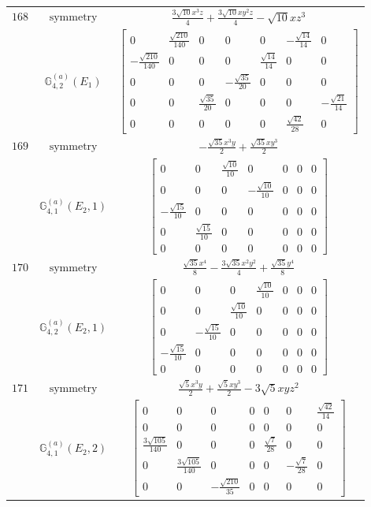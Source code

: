 \documentclass[fleqn,8pt,landscape]{jsarticle}
\begin{document}
\begin{longtable}{ccc}
$ 168 $ & $ \text{symmetry} $ & $ \frac{3 \sqrt{10} x^{3} z}{4} + \frac{3 \sqrt{10} x y^{2} z}{4} - \sqrt{10} x z^{3} $ \\
$  $ & $ \mathbb{G}_{4,2}^{(a)}(E_{1}) $ & $ \begin{bmatrix} 0 & \frac{\sqrt{210}}{140} & 0 & 0 & 0 & - \frac{\sqrt{14}}{14} & 0 \\ - \frac{\sqrt{210}}{140} & 0 & 0 & 0 & \frac{\sqrt{14}}{14} & 0 & 0 \\ 0 & 0 & 0 & - \frac{\sqrt{35}}{20} & 0 & 0 & 0 \\ 0 & 0 & \frac{\sqrt{35}}{20} & 0 & 0 & 0 & - \frac{\sqrt{21}}{14} \\ 0 & 0 & 0 & 0 & 0 & \frac{\sqrt{42}}{28} & 0 \end{bmatrix} $ \\ \hline
$ 169 $ & $ \text{symmetry} $ & $ - \frac{\sqrt{35} x^{3} y}{2} + \frac{\sqrt{35} x y^{3}}{2} $ \\
$  $ & $ \mathbb{G}_{4,1}^{(a)}(E_{2},1) $ & $ \begin{bmatrix} 0 & 0 & \frac{\sqrt{10}}{10} & 0 & 0 & 0 & 0 \\ 0 & 0 & 0 & - \frac{\sqrt{10}}{10} & 0 & 0 & 0 \\ - \frac{\sqrt{15}}{10} & 0 & 0 & 0 & 0 & 0 & 0 \\ 0 & \frac{\sqrt{15}}{10} & 0 & 0 & 0 & 0 & 0 \\ 0 & 0 & 0 & 0 & 0 & 0 & 0 \end{bmatrix} $ \\ \hline
$ 170 $ & $ \text{symmetry} $ & $ \frac{\sqrt{35} x^{4}}{8} - \frac{3 \sqrt{35} x^{2} y^{2}}{4} + \frac{\sqrt{35} y^{4}}{8} $ \\
$  $ & $ \mathbb{G}_{4,2}^{(a)}(E_{2},1) $ & $ \begin{bmatrix} 0 & 0 & 0 & \frac{\sqrt{10}}{10} & 0 & 0 & 0 \\ 0 & 0 & \frac{\sqrt{10}}{10} & 0 & 0 & 0 & 0 \\ 0 & - \frac{\sqrt{15}}{10} & 0 & 0 & 0 & 0 & 0 \\ - \frac{\sqrt{15}}{10} & 0 & 0 & 0 & 0 & 0 & 0 \\ 0 & 0 & 0 & 0 & 0 & 0 & 0 \end{bmatrix} $ \\ \hline
$ 171 $ & $ \text{symmetry} $ & $ \frac{\sqrt{5} x^{3} y}{2} + \frac{\sqrt{5} x y^{3}}{2} - 3 \sqrt{5} x y z^{2} $ \\
$  $ & $ \mathbb{G}_{4,1}^{(a)}(E_{2},2) $ & $ \begin{bmatrix} 0 & 0 & 0 & 0 & 0 & 0 & \frac{\sqrt{42}}{14} \\ 0 & 0 & 0 & 0 & 0 & 0 & 0 \\ \frac{3 \sqrt{105}}{140} & 0 & 0 & 0 & \frac{\sqrt{7}}{28} & 0 & 0 \\ 0 & \frac{3 \sqrt{105}}{140} & 0 & 0 & 0 & - \frac{\sqrt{7}}{28} & 0 \\ 0 & 0 & - \frac{\sqrt{210}}{35} & 0 & 0 & 0 & 0 \end{bmatrix} $ \\ \hline

\end{longtable}
\end{document}
